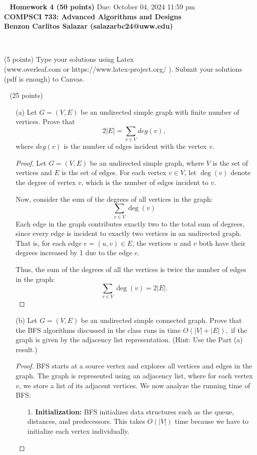 \documentclass[12pt]{article}
\newcommand{\vs}{\vspace{2mm}}
\newcommand{\ls}{\vspace{5mm}}
\newcommand{\bc}{\begin{center}}
\newcommand{\ec}{\end{center}}
\begin{document}
\bc\ 
 { \bf Homework  4 (50 points)}  Due: October 04, 2024 11:59 pm\\
 { \bf COMPSCI 733: Advanced Algorithms and Designs } \\ 
 { \bf Benzon Carlitos Salazar (salazarbc24@uww.edu) } 
\ec\
\ls\

 (5 points)
Type your solutions using Latex \\
(www.overleaf.com or https://www.latex-project.org/ ). Submit your solutions (pdf is enough)  to Canvas. 

\vs\
\noindent{\bf Problem 1: } (25 points)
\vs\

\begin{itemize}

\item[(a)] Let $G = (V, E)$ be an undirected simple graph with finite number of vertices. Prove that 
\[ 2 |E| = \sum_{v \in V} deg(v), \]
where $deg(v)$ is the number of edges incident with the vertex $v$.
 \ls\

\begin{proof}   
Let $G = (V, E)$ be an undirected simple graph, where $V$ is the set of vertices and $E$ is the set of edges. For each vertex $v \in V$, let $\deg(v)$ denote the degree of vertex $v$, which is the number of edges incident to $v$.

Now, consider the sum of the degrees of all vertices in the graph:
\[
\sum_{v \in V} \deg(v)
\]
Each edge in the graph contributes exactly two to the total sum of degrees, since every edge is incident to exactly two vertices in an undirected graph. That is, for each edge $e = (u, v) \in E$, the vertices $u$ and $v$ both have their degrees increased by 1 due to the edge $e$.

Thus, the sum of the degrees of all the vertices is twice the number of edges in the graph:
\[
\sum_{v \in V} \deg(v) = 2|E|.
\]
\end{proof}

\item[(b)] Let $G = (V, E)$ be an undirected simple connected  graph. Prove that  the BFS algorithms discussed in the class runs in time $O(|V|+|E|),$ if the graph is given by the adjacency list
representation. (Hint: Use the Part (a) result.)

\begin{proof}
BFS starts at a source vertex and explores all vertices and edges in the graph. The graph is represented using an adjacency list, where for each vertex $v$, we store a list of its adjacent vertices. We now analyze the running time of BFS:
\begin{itemize}
    \item[1.] \textbf{Initialization:} BFS initializes data structures such as the queue, distances, and predecessors. This takes $O(|V|)$ time because we have to initialize each vertex individually.


\end{itemize}
\end{proof}
\end{itemize}
\end{document}
